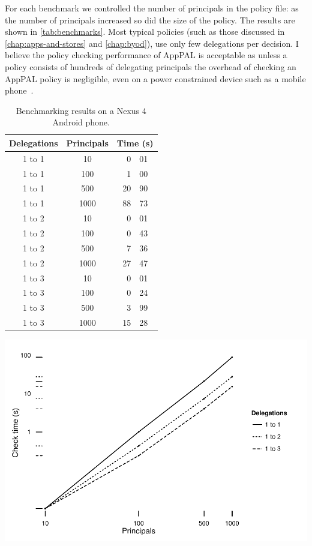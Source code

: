 \documentclass[thesis.tex]{subfiles}
\begin{document}
For each benchmark we controlled the number of principals in the policy file:
as the number of principals increased so did the size of the policy.
The results are shown in \autoref{tab:benchmarks}.
Most typical policies (such as those discussed in \autoref{chap:apps-and-stores} and \autoref{chap:byod}), use only few delegations per decision.
I believe the policy checking performance of AppPAL is acceptable as unless a policy consists of hundreds of delegating principals the overhead of checking an AppPAL policy is negligible, even on a power constrained device such as a mobile phone~\cite{hallett_apppal_2016}.

\begin{table}
  \centering\sffamily
    \begin{tabular}{c c r@{.}l}
      \toprule
      Delegations & Principals & \multicolumn{2}{c}{Time (s)} \\
      \midrule
      1 to 1 & 10   &  0&01 \\
      1 to 1 & 100  &  1&00 \\
      1 to 1 & 500  & 20&90 \\
      1 to 1 & 1000 & 88&73 \\
      \midrule
      1 to 2 & 10   &  0&01 \\
      1 to 2 & 100  &  0&43 \\
      1 to 2 & 500  &  7&36 \\
      1 to 2 & 1000 & 27&47 \\
      \midrule
      1 to 3 & 10   &  0&01 \\
      1 to 3 & 100  &  0&24 \\
      1 to 3 & 500  &  3&99 \\
      1 to 3 & 1000 & 15&28 \\
      \bottomrule
    \end{tabular}
    \includegraphics[width=1.00\linewidth]{figures/benchmarks.pdf}
  \caption{Benchmarking results on a Nexus 4 Android phone.}
  \label{tab:benchmarks}
\end{table}



\ignore{
  
}
\end{document}
